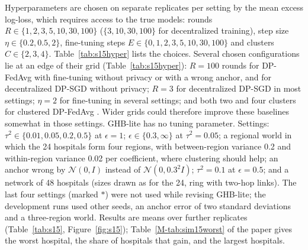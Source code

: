 \documentclass[acmsmall,screen,nonacm]{acmart}
\theoremstyle{acmdefinition}
\begin{document}
Hyperparameters are chosen on \SimFifteenTune{} separate replicates per setting by the mean excess log-loss, which requires access to the true models: rounds $R\in\{1,2,3,5,10,30,100\}$ ($\{3,10,30,100\}$ for decentralized training), step size $\eta\in\{0.2,0.5,2\}$, fine-tuning steps $E\in\{0,1,2,3,5,10,30,100\}$ and clusters $C\in\{2,3,4\}$. Table~\ref{tab:s15hyper} lists the choices. Several chosen configurations lie at an edge of their grid (Table~\ref{tab:s15hyper}): $R=100$ rounds for DP-FedAvg with fine-tuning \cite{mcmahan2018learning} without privacy or with a wrong anchor, and for decentralized DP-SGD \cite{lian2017can} without privacy; $R=3$ for decentralized DP-SGD in most settings; $\eta=2$ for fine-tuning in several settings; and both two and four clusters for clustered DP-FedAvg \cite{ghosh2020efficient}. Wider grids could therefore improve these baselines somewhat in those settings. GHB-lite has no tuning parameter. Settings: $\tau^2\in\{0.01,0.05,0.2,0.5\}$ at $\epsilon=1$; $\epsilon\in\{0.3,\infty\}$ at $\tau^2=0.05$; a regional world in which the 24 hospitals form four regions, with between-region variance 0.2 and within-region variance 0.02 per coefficient, where clustering should help; an anchor wrong by $\mathcal{N}(0,I)$ instead of $\mathcal{N}(0,0.3^2I)$; $\tau^2=0.1$ at $\epsilon=0.5$; and a network of 48 hospitals (sizes drawn as for the 24, ring with two-hop links). The last four settings (marked $\ast$) were not used while revising GHB-lite; the development runs used other seeds, an anchor error of two standard deviations and a three-region world. Results are means over \SimFifteenReps{} further replicates (Table~\ref{tab:s15}, Figure~\ref{fig:s15}); Table~\ref{M-tab:sim15worst} of the paper gives the worst hospital, the share of hospitals that gain, and the largest hospitals.
\end{document}
